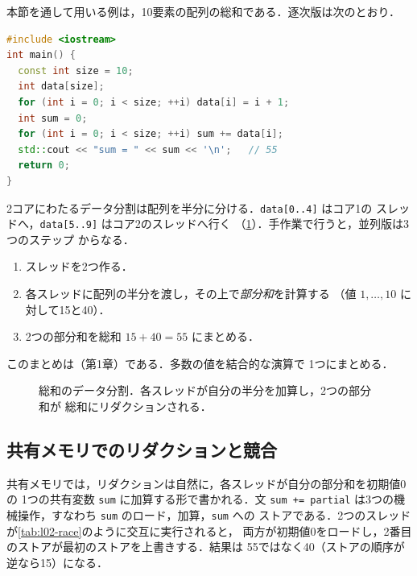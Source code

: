 \documentclass[../main.tex]{subfiles}
\begin{document}
本節を通して用いる例は，10要素の配列の総和である．逐次版は次のとおり．
\begin{lstlisting}[language=C++, numbers=none]
#include <iostream>
int main() {
  const int size = 10;
  int data[size];
  for (int i = 0; i < size; ++i) data[i] = i + 1;
  int sum = 0;
  for (int i = 0; i < size; ++i) sum += data[i];
  std::cout << "sum = " << sum << '\n';   // 55
  return 0;
}
\end{lstlisting}
2コアにわたるデータ分割は配列を半分に分ける．\texttt{data[0..4]} はコア1の
スレッドへ，\texttt{data[5..9]} はコア2のスレッドへ行く
（\cref{fig:l02-data-decomposition}）．手作業で行うと，並列版は3つのステップ
からなる．
\begin{enumerate}
  \item スレッドを2つ作る．
  \item 各スレッドに配列の半分を渡し，その上で\emph{部分和}を計算する
    （値 $1,\ldots,10$ に対して15と40）．
  \item 2つの部分和を総和 $15+40=55$ にまとめる．
\end{enumerate}
このまとめは（第1章）である．多数の値を結合的な演算で
1つにまとめる．

\begin{figure}[tb]
  \centering
  
  \caption{総和のデータ分割．各スレッドが自分の半分を加算し，2つの部分和が
    総和にリダクションされる．}
  \label{fig:l02-data-decomposition}
\end{figure}

\subsection{共有メモリでのリダクションと競合}

共有メモリでは，リダクションは自然に，各スレッドが自分の部分和を初期値0の
1つの共有変数 \texttt{sum} に加算する形で書かれる．文 \texttt{sum += partial}
は3つの機械操作，すなわち \texttt{sum} のロード，加算，\texttt{sum} への
ストアである．2つのスレッドが\cref{tab:l02-race}のように交互に実行されると，
両方が初期値0をロードし，2番目のストアが最初のストアを上書きする．結果は
55ではなく40（ストアの順序が逆なら15）になる．
\end{document}
